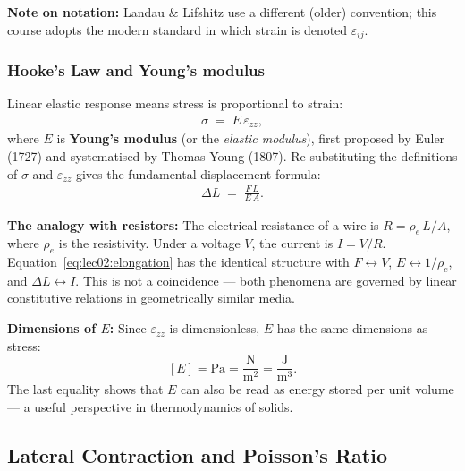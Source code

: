 \textbf{Note on notation:} Landau \& Lifshitz use a different
(older) convention; this course adopts the modern standard in which
strain is denoted $\varepsilon_{ij}$.

\subsubsection*{Hooke's Law and Young's modulus}

Linear elastic response means stress is proportional to strain:
\begin{align}
    \boxed{\sigma \;=\; E\,\varepsilon_{zz}},
    \label{eq:lec02:hooke1d}
\end{align}
where $E$ is \textbf{Young's modulus} (or the \emph{elastic modulus}),
first proposed by Euler (1727) and systematised by Thomas Young (1807).
Re-substituting the definitions of $\sigma$ and $\varepsilon_{zz}$ gives
the fundamental displacement formula:
\begin{align}
    \boxed{\Delta L \;=\; \frac{F\,L}{E\,A}}.
    \label{eq:lec02:elongation}
\end{align}

\textbf{The analogy with resistors:}  
The electrical resistance of a wire is $R = \rho_e\,L/A$, where $\rho_e$
is the resistivity.  Under a voltage $V$, the current is $I = V/R$.
Equation~\eqref{eq:lec02:elongation} has the identical structure with
$F \leftrightarrow V$, $E \leftrightarrow 1/\rho_e$, and
$\Delta L \leftrightarrow I$.  This is not a coincidence — both
phenomena are governed by linear constitutive relations in geometrically
similar media.

\textbf{Dimensions of $E$:}  Since $\varepsilon_{zz}$ is dimensionless,
$E$ has the same dimensions as stress:
\[
    [E] = \text{Pa} = \frac{\text{N}}{\text{m}^2}
        = \frac{\text{J}}{\text{m}^3}.
\]
The last equality shows that $E$ can also be read as energy stored per
unit volume — a useful perspective in thermodynamics of solids.

\subsection{Lateral Contraction and Poisson's Ratio}
\label{subsec:lec02:poisson}

